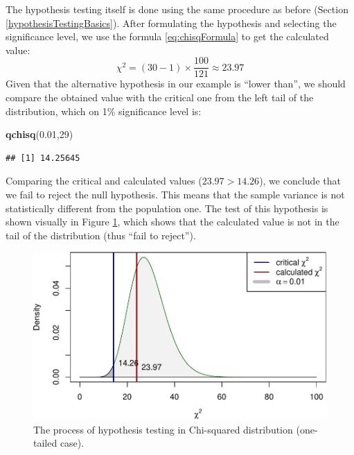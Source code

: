 \documentclass[
]{book}
\newenvironment{Shaded}{\begin{snugshade}}{\end{snugshade}}
\newcommand{\DecValTok}[1]{\textcolor[rgb]{0.00,0.00,0.81}{#1}}
\newcommand{\FloatTok}[1]{\textcolor[rgb]{0.00,0.00,0.81}{#1}}
\newcommand{\FunctionTok}[1]{\textcolor[rgb]{0.13,0.29,0.53}{\textbf{#1}}}
\newcommand{\NormalTok}[1]{#1}
\theoremstyle{definition}
\theoremstyle{definition}
\theoremstyle{definition}
\theoremstyle{definition}
\theoremstyle{remark}
\begin{document}
The hypothesis testing itself is done using the same procedure as before (Section \ref{hypothesisTestingBasics}). After formulating the hypothesis and selecting the significance level, we use the formula \eqref{eq:chisqFormula} to get the calculated value:
\begin{equation*}
    \chi^2 = (30-1) \times \frac{100}{121} \approx 23.97
\end{equation*}
Given that the alternative hypothesis in our example is ``lower than'', we should compare the obtained value with the critical one from the left tail of the distribution, which on 1\% significance level is:

\begin{Shaded}
\begin{Highlighting}[]
\FunctionTok{qchisq}\NormalTok{(}\FloatTok{0.01}\NormalTok{,}\DecValTok{29}\NormalTok{)}
\end{Highlighting}
\end{Shaded}

\begin{verbatim}
## [1] 14.25645
\end{verbatim}

Comparing the critical and calculated values (\(23.97>14.26\)), we conclude that we fail to reject the null hypothesis. This means that the sample variance is not statistically different from the population one. The test of this hypothesis is shown visually in Figure \ref{fig:hypothesisTestingChiSquared}, which shows that the calculated value is not in the tail of the distribution (thus ``fail to reject'').

\begin{figure}
\centering
\includegraphics{Svetunkov---Statistics-for-Business-Analytics_files/figure-latex/hypothesisTestingChiSquared-1.pdf}
\caption{\label{fig:hypothesisTestingChiSquared}The process of hypothesis testing in Chi-squared distribution (one-tailed case).}
\end{figure}
\end{document}
